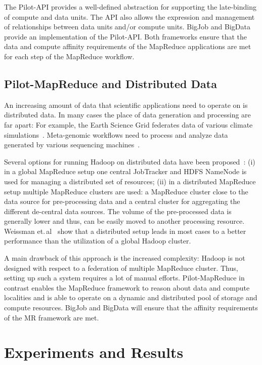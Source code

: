 \documentclass{acm_proc_article-sp}
\newcommand{\pilotmapreduce}{Pilot-MapReduce\xspace}
\begin{document}
The Pilot-API provides a well-defined abstraction for supporting the
late-binding of compute and data units. The API also allows the expression and
management of relationships between data units and/or compute units. BigJob
and BigData provide an implementation of the Pilot-API. Both frameworks ensure
that the data and compute affinity requirements of the MapReduce applications
are met for each step of the MapReduce workflow.


\subsection{Pilot-MapReduce and Distributed Data}

An increasing amount of data that scientific applications need to operate on 
is distributed data. In many cases the place of data 
generation and processing are far apart: For example, the Earth Science Grid 
federates data of various climate simulations~\cite{ESG}. Meta-genomic 
workflows need to process and analyze data generated by various sequencing 
machines~\cite{Jha:2011fk}.

Several options for running Hadoop on distributed data have been
proposed~\cite{weissman-mr-11}: (i) in a global MapReduce setup one central
JobTracker and HDFS NameNode is used for managing a distributed set of
resources; (ii) in a distributed MapReduce setup multiple MapReduce clusters
are used: a MapReduce cluster close to the data source for pre-processing data
and a central cluster for aggregating the different de-central data sources.
The volume of the pre-processed data is generally lower and thus, can be
easily moved to another processing resource. Weissman
et.\,al~\cite{weissman-mr-11} show that a distributed setup leads in most
cases to a better performance than the utilization of a global Hadoop cluster.

A main drawback of this approach is the increased complexity: Hadoop is not 
designed with respect to a federation of multiple MapReduce cluster. Thus, 
setting up such a system requires a lot of manual efforts. \pilotmapreduce in 
contrast enables the MapReduce framework to reason about data and compute 
localities and is able to operate on a dynamic and distributed pool of storage 
and compute resources. BigJob and BigData will ensure that the affinity 
requirements of the MR framework are met.


\section{Experiments and Results}
\end{document}
